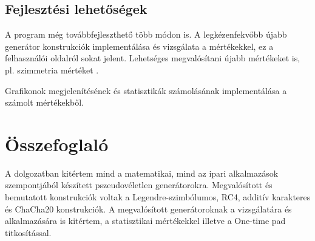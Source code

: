 \documentclass[12pt]{article}
\begin{document}
\subsection{Fejlesztési lehetőségek}
A program még továbbfejleszthető több módon is. A legkézenfekvőbb újabb generátor konstrukciók implementálása és vizsgálata a mértékekkel, ez a felhasználói oldalról sokat jelent. Lehetséges megvalósítani újabb mértékeket is, pl. szimmetria mértéket \cite{symmetry}.

Grafikonok megjelenítésének és statisztikák számolásának implementálása a számolt mértékekből.
\section{Összefoglaló}
A dolgozatban kitértem mind a matematikai, mind az ipari alkalmazások szempontjából készített pszeudovéletlen generátorokra. Megvalósított és bemutatott konstrukciók voltak a Legendre-szimbólumos, RC4, additív karakteres és ChaCha20 konstrukciók. A megvalósított generátoroknak a vizsgálatára és alkalmazására is kitértem, a statisztikai mértékekkel illetve a One-time pad titkosítással. 
\end{document}
